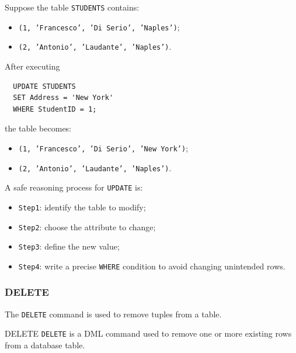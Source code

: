  \begin{example}
  Suppose the table \texttt{STUDENTS} contains:
  \begin{itemize}
   \item \texttt{(1, 'Francesco', 'Di Serio', 'Naples')};
   \vspace{0.2cm}
   \item \texttt{(2, 'Antonio', 'Laudante', 'Naples')}.
  \end{itemize}

  After executing
  \begin{verbatim}
  UPDATE STUDENTS
  SET Address = 'New York'
  WHERE StudentID = 1;
  \end{verbatim}
  \vspace{-0.4cm}

  the table becomes:
  \begin{itemize}
   \item \texttt{(1, 'Francesco', 'Di Serio', 'New York')};
   \vspace{0.2cm}
   \item \texttt{(2, 'Antonio', 'Laudante', 'Naples')}.
  \end{itemize}



  A safe reasoning process for \texttt{UPDATE} is:
  \begin{itemize}
   \item \texttt{Step1}: identify the table to modify;
  
   \item \texttt{Step2}: choose the attribute to change;
  
   \item \texttt{Step3}: define the new value;
  
   \item \texttt{Step4}: write a precise \texttt{WHERE} condition to avoid changing unintended rows.
  \end{itemize}
 \end{example}

 \subsubsection{DELETE}

 The \texttt{DELETE} command is used to remove tuples from a table.

 \begin{defbox}{DELETE}
  \texttt{DELETE} is a DML command used to remove one or more existing rows from a database table.
 \end{defbox}

